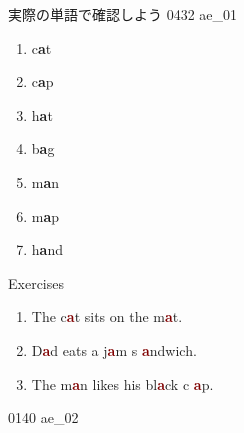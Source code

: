 \documentclass[aspectratio=169, xcolor={dvipsnames,table}]{beamer}
\begin{document}
\begin{frame}[plain]{実際の単語で確認しよう}
  \LARGE \hfill{\tiny 0432}\,{\scriptsize {}\,{\tiny ae\_01}}

  \begin{enumerate}
    \item c\textcolor{NavyBlue}{\bfseries a}t%
          \hfill
          \hspace{150pt}\mbox{}

    \item c\textcolor{NavyBlue}{\bfseries a}p \hfill
          \hspace{150pt}\mbox{}

    \item h\textcolor{NavyBlue}{\bfseries a}t \hfill
          \hspace{150pt}\mbox{}

    \item b\textcolor{NavyBlue}{\bfseries a}g \hfill
          \hspace{150pt}\mbox{}

    \item m\textcolor{NavyBlue}{\bfseries a}n \hfill
          \hspace{150pt}\mbox{}

    \item m\textcolor{NavyBlue}{\bfseries a}p \hfill
          \hspace{150pt}\mbox{}

    \item h\textcolor{NavyBlue}{\bfseries a}nd \hfill
          \hspace{150pt}\mbox{}
  \end{enumerate}
\end{frame}
\begin{frame}[plain]{Exercises \textipa{/\ae /}}
  \LARGE

  \begin{enumerate}
    \item The c\textcolor{Maroon}{\bfseries a}t sits on the m\textcolor{Maroon}{\bfseries a}t.

    \item D\textcolor{Maroon}{\bfseries a}d eats a j\textcolor{Maroon}{\bfseries a}m s\textcolor{Maroon}{\bfseries
            a}ndwich.

    \item The m\textcolor{Maroon}{\bfseries a}n likes his bl\textcolor{Maroon}{\bfseries a}ck c\textcolor{Maroon}{\bfseries
            a}p.
  \end{enumerate}

  \hfill{\tiny 0140}\,{\scriptsize {}\,{\tiny ae\_02}}
\end{frame}
\end{document}
